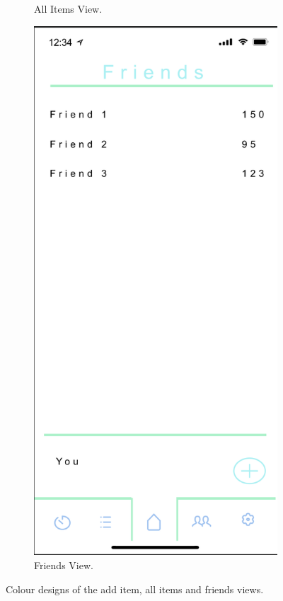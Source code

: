 \begin{figure}[H]
\begin{subfigure}[b]{0.3\textwidth}
        \caption{All Items View.}
        \label{fig:all_items_colour}
    \end{subfigure}
    \hfill
    \begin{subfigure}[b]{0.3\textwidth}
        \centering
        \includegraphics[width=\textwidth]{./graphics/design/Friends Colour.png}
        \caption{Friends View.}
        \label{fig:friends_colour}
    \end{subfigure}
    
    \caption{Colour designs of the add item, all items and friends views.}
    \label{fig:additem_allitems_friends_colour}
\end{figure}

